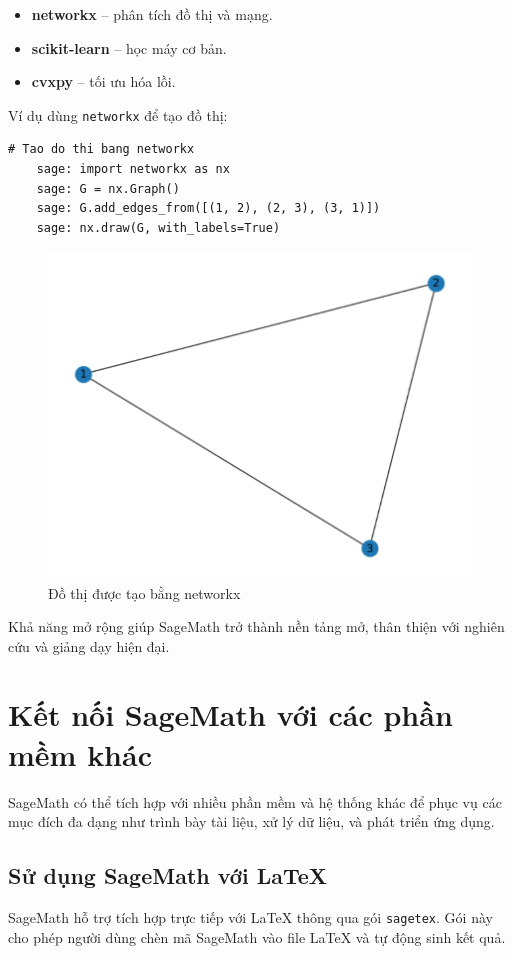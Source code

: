 \begin{itemize}
	\item \textbf{networkx} – phân tích đồ thị và mạng.
	\item \textbf{scikit-learn} – học máy cơ bản.
	\item \textbf{cvxpy} – tối ưu hóa lồi.
\end{itemize}

Ví dụ dùng \texttt{networkx} để tạo đồ thị:

\begin{lstlisting}[basicstyle=\ttfamily\small]
	# Tao do thi bang networkx
	sage: import networkx as nx
	sage: G = nx.Graph()
	sage: G.add_edges_from([(1, 2), (2, 3), (3, 1)])
	sage: nx.draw(G, with_labels=True)
\end{lstlisting}

\begin{figure}[H]
	\centering
	\includegraphics[width=0.45\linewidth]{images/423}
	\caption{Đồ thị được tạo bằng networkx}
	\label{fig:423}
\end{figure}


Khả năng mở rộng giúp SageMath trở thành nền tảng mở, thân thiện với nghiên cứu và giảng dạy hiện đại.

\newpage
\section{Kết nối SageMath với các phần mềm khác}

SageMath có thể tích hợp với nhiều phần mềm và hệ thống khác để phục vụ các mục đích đa dạng như trình bày tài liệu, xử lý dữ liệu, và phát triển ứng dụng.

\subsection{Sử dụng SageMath với \LaTeX{}}

SageMath hỗ trợ tích hợp trực tiếp với \LaTeX{} thông qua gói \texttt{sagetex}. Gói này cho phép người dùng chèn mã SageMath vào file \LaTeX{} và tự động sinh kết quả.

